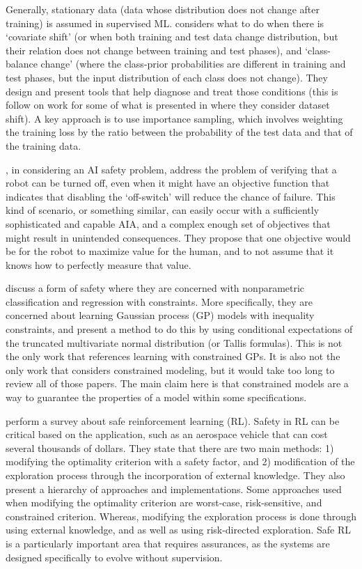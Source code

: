     Generally, stationary data (data whose distribution does not change after training) is assumed in supervised ML. \citet{Sugiyama2013-ci} considers what to do when there is `covariate shift' (or when both training and test data change distribution, but their relation does not change between training and test phases), and `class-balance change' (where the class-prior probabilities are different in training and test phases, but the input distribution of each class does not change). They design and present tools that help diagnose and treat those conditions (this is follow on work for some of what is presented in \citet{Quinonero-Candela2009-fj} where they consider dataset shift). A key approach is to use importance sampling, which involves weighting the training loss by the ratio between the probability of the test data and that of the training data.

    \citet{Hadfield-Menell2016-ws}, in considering an AI safety problem, address the problem of verifying that a robot can be turned off, even when it might have an objective function that indicates that disabling the `off-switch' will reduce the chance of failure. This kind of scenario, or something similar, can easily occur with a sufficiently sophisticated and capable AIA, and a complex enough set of objectives that might result in unintended consequences. They propose that one objective would be for the robot to maximize value for the human, and to not assume that it knows how to perfectly measure that value. 

    \citet{Da_Veiga2012-gh} discuss a form of safety where they are concerned with nonparametric classification and regression with constraints. More specifically, they are concerned about learning Gaussian process (GP) models with inequality constraints, and present a method to do this by using conditional expectations of the truncated multivariate normal distribution (or Tallis formulas). This is not the only work that references learning with constrained GPs. It is also not the only work that considers constrained modeling, but it would take too long to review all of those papers. The main claim here is that constrained models are a way to guarantee the properties of a model within some specifications.

    \citet{Garcia2015-rs} perform a survey about safe reinforcement learning (RL). Safety in RL can be critical based on the application, such as an aerospace vehicle that can cost several thousands of dollars. They state that there are two main methods: 1) modifying the optimality criterion with a safety factor, and 2) modification of the exploration process through the incorporation of external knowledge. They also present a hierarchy of approaches and implementations. Some approaches used when modifying the optimality criterion are worst-case, risk-sensitive, and constrained criterion. Whereas, modifying the exploration process is done through using external knowledge, and as well as using risk-directed exploration. Safe RL is a particularly important area that requires assurances, as the systems are designed specifically to evolve without supervision.

